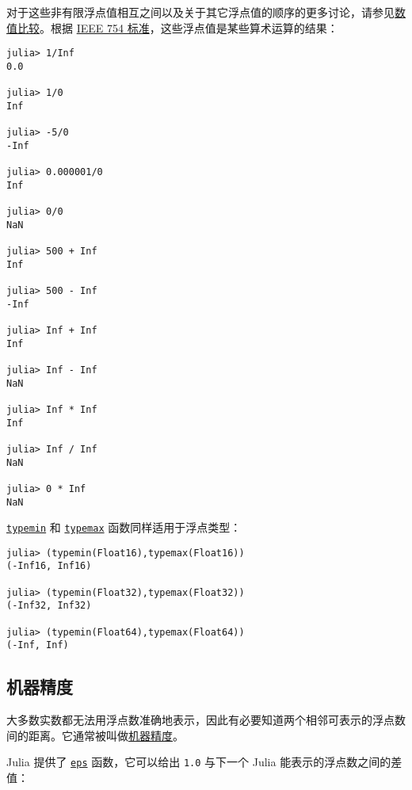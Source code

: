 


对于这些非有限浮点值相互之间以及关于其它浮点值的顺序的更多讨论，请参见\hyperlink{7125151170457482788}{数值比较}。根据 \href{https://en.wikipedia.org/wiki/IEEE\_754\_revision}{IEEE 754 标准}，这些浮点值是某些算术运算的结果：




\begin{verbatim}
julia> 1/Inf
0.0

julia> 1/0
Inf

julia> -5/0
-Inf

julia> 0.000001/0
Inf

julia> 0/0
NaN

julia> 500 + Inf
Inf

julia> 500 - Inf
-Inf

julia> Inf + Inf
Inf

julia> Inf - Inf
NaN

julia> Inf * Inf
Inf

julia> Inf / Inf
NaN

julia> 0 * Inf
NaN
\end{verbatim}



\hyperlink{3613894539247233488}{\texttt{typemin}} 和 \hyperlink{17760305803764597758}{\texttt{typemax}} 函数同样适用于浮点类型：




\begin{verbatim}
julia> (typemin(Float16),typemax(Float16))
(-Inf16, Inf16)

julia> (typemin(Float32),typemax(Float32))
(-Inf32, Inf32)

julia> (typemin(Float64),typemax(Float64))
(-Inf, Inf)
\end{verbatim}



\hypertarget{7614874233242990296}{}


\subsection{机器精度}



大多数实数都无法用浮点数准确地表示，因此有必要知道两个相邻可表示的浮点数间的距离。它通常被叫做\href{https://en.wikipedia.org/wiki/Machine\_epsilon}{机器精度}。



Julia 提供了 \hyperlink{4594213520310841636}{\texttt{eps}} 函数，它可以给出 \texttt{1.0} 与下一个 Julia 能表示的浮点数之间的差值：




